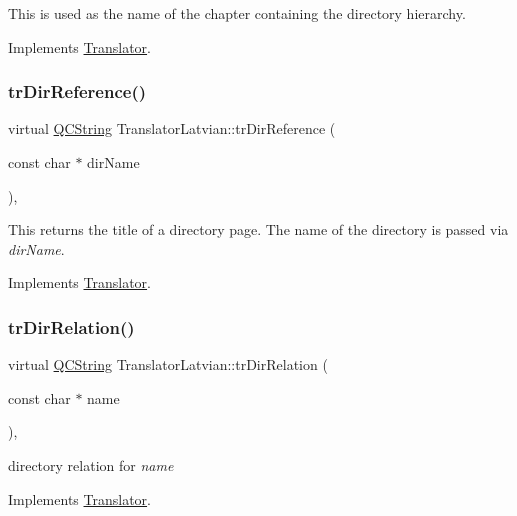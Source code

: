 This is used as the name of the chapter containing the directory hierarchy. 

Implements \mbox{\hyperlink{class_translator}{Translator}}.

\mbox{\label{class_translator_latvian_a299071352243ece382520ec9abc2480b}} 
\subsubsection{\texorpdfstring{trDirReference()}{trDirReference()}}
{\footnotesize\ttfamily virtual \mbox{\hyperlink{class_q_c_string}{Q\+C\+String}} Translator\+Latvian\+::tr\+Dir\+Reference (\begin{DoxyParamCaption}\item[{const char $\ast$}]{dir\+Name }\end{DoxyParamCaption})\hspace{0.3cm}{\ttfamily [inline]}, {\ttfamily [virtual]}}

This returns the title of a directory page. The name of the directory is passed via {\itshape dir\+Name}. 

Implements \mbox{\hyperlink{class_translator}{Translator}}.

\mbox{\label{class_translator_latvian_ae04e2609cd78b50e30e682ab403b760b}} 
\subsubsection{\texorpdfstring{trDirRelation()}{trDirRelation()}}
{\footnotesize\ttfamily virtual \mbox{\hyperlink{class_q_c_string}{Q\+C\+String}} Translator\+Latvian\+::tr\+Dir\+Relation (\begin{DoxyParamCaption}\item[{const char $\ast$}]{name }\end{DoxyParamCaption})\hspace{0.3cm}{\ttfamily [inline]}, {\ttfamily [virtual]}}

directory relation for {\itshape name} 

Implements \mbox{\hyperlink{class_translator}{Translator}}.

